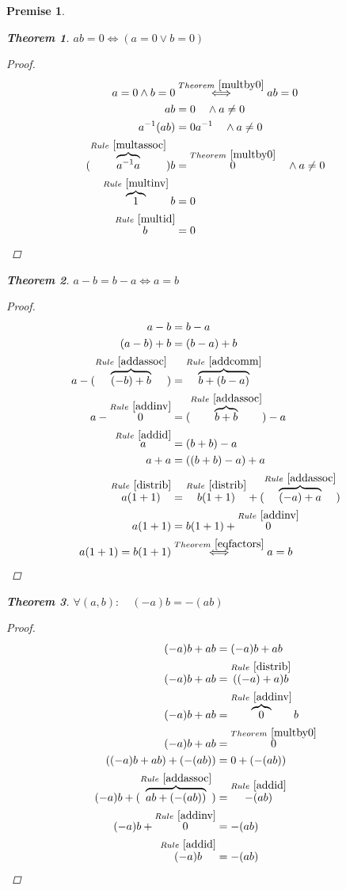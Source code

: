\documentclass{article}
\numberwithin{equation}{subsubsection}
\newtheorem*{prem}{Premise}
\newtheorem{thm}{Theorem}
\newcommand{\fromb}[3]{\overbrace{#3}^{#1~\ref{#2}}}
\newcommand{\from}[3]{\overset{#1~\ref{#2}}{#3}}
\begin{document}
\begin{prem}
	    \begin{thm}\label{prodof0}
		$ ab = 0 \iff (a = 0 \vee b = 0) $
		\begin{proof}
		    \begin{align}
			a = 0 \wedge b = 0 &\from{Theorem}{multby0}{\iff} ab = 0 \\ %
			ab &= 0 \quad \wedge a \neq 0 \\
			a^{-1}(ab) &= 0a^{-1} \quad \wedge a \neq 0 \\
			(\fromb{Rule}{multassoc}{a^{-1}a})b &= \from{Theorem}{multby0}{0} \quad \wedge a \neq 0 \\
			\fromb{Rule}{multinv}{1}b &= 0 \\
			\from{Rule}{multid}{b} &= 0
		    \end{align}
		\end{proof}
	    \end{thm}

	    \begin{thm}\label{subtreq}
		$ a - b = b - a \iff a = b $
		\begin{proof}
		    \begin{align}
			a - b &= b - a \\
			(a - b) + b &= (b - a) + b \\
			a - (\fromb{Rule}{addassoc}{(-b) + b}) &= \fromb{Rule}{addcomm}{b + (b - a)} \\
			a - \from{Rule}{addinv}{0} &= (\fromb{Rule}{addassoc}{b + b}) - a \\
			\from{Rule}{addid}{a} &= (b + b) - a \\
			a + a &= ((b + b) - a) + a \\
			\from{Rule}{distrib}{a(1 + 1)} &= \from{Rule}{distrib}{b(1 + 1)} + (\fromb{Rule}{addassoc}{(-a) + a}) \\
			a(1 + 1) &= b(1 + 1) + \from{Rule}{addinv}{0} \\
			a(1 + 1) = b(1 + 1) &\from{Theorem}{eqfactors}{\iff} a = b
		    \end{align}
		\end{proof}
	    \end{thm}

	    \begin{thm}\label{distrofneg}
		$ \forall (a,b) : \quad (-a)b = -(ab) $
		\begin{proof}
		    \begin{align}
			(-a)b + ab &= (-a)b + ab \\
			(-a)b + ab &= \from{Rule}{distrib}{((-a) + a)b} \\
			(-a)b + ab &= \fromb{Rule}{addinv}{0}b \\
			(-a)b + ab &= \from{Theorem}{multby0}{0} \\
			((-a)b + ab) + (-(ab)) &= 0 + (-(ab)) \\
			(-a)b + (\fromb{Rule}{addassoc}{ab +(-(ab))}) &= \from{Rule}{addid}{-(ab)} \\
			(-a)b + \from{Rule}{addinv}{0} &= -(ab) \\
			\from{Rule}{addid}{(-a)b} &= -(ab)
		    \end{align}
		\end{proof}
	    \end{thm}
	    

\end{prem}
\end{document}
